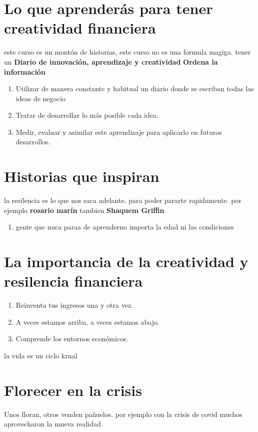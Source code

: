 \documentclass{article}
\begin{document}

\newpage
{}
\tableofcontents
\newpage

\section{Lo que aprenderás para tener creatividad financiera}
este curso es un montón de historias, este curso no es una formula magiga.
tener un \textbf{Diario de innovación, aprendizaje y creatividad}
\textbf{Ordena la información}
\begin{enumerate}
    \item Utilizar de manera constante y
    habitual un diario donde se escriban
    todas las ideas de negocio
    \item Tratar de desarrollar lo más posible
    cada idea.
    \item Medir, evaluar y asimilar este
    aprendizaje para aplicarlo en futuros
    desarrollos.
\end{enumerate}


\section{Historias que inspiran}
la resilencia es lo que nos saca adelante.
para poder pararte rapidamente.
por ejemplo \textbf{rosario marín} tambien \textbf{Shaquem Griffin}
\begin{enumerate}
    \item gente que nuca paraa de aprenderno importa la edad ni las condiciones
\end{enumerate}

\section{La importancia de la creatividad y resilencia financiera}
\begin{enumerate}
    \item Reinventa tus ingresos
    una y otra vez.
    \item  A veces estamos arriba,
    a veces estamos abajo.
    \item  Comprende los entornos
    económicos.
\end{enumerate}
la vida es un ciclo krnal 

\section{Florecer en la crisis}
Unos lloran, otros venden pañuelos.
por ejemplo con la crisis de covid muchos aprovecharon la mueva realidad.
\end{document}
